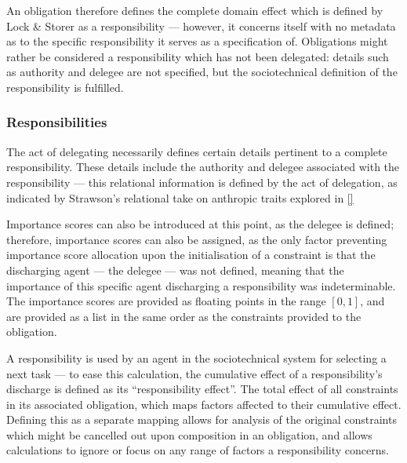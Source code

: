 An obligation therefore defines the complete domain effect which is defined by Lock \& Storer as a responsibility --- however, it concerns itself with no metadata as to the specific responsibility it serves as a specification of. Obligations might rather be considered a responsibility which has not been delegated: details such as authority and delegee are not specified, but the sociotechnical definition of the responsibility is fulfilled.\par

\subsubsection{Responsibilities}\label{subsec:responsibilities}  %
The act of delegating necessarily defines certain details pertinent to a complete responsibility. These details include the authority and delegee associated with the responsibility --- this relational information is defined by the act of delegation, as indicated by Strawson's relational take on anthropic traits explored in \cref{}\par

Importance scores can also be introduced at this point, as the delegee is defined; therefore, importance scores can also be assigned, as the only factor preventing importance score allocation upon the initialisation of a constraint is that the discharging agent --- the delegee --- was not defined, meaning that the importance of this specific agent discharging a responsibility was indeterminable. The importance scores are provided as floating points in the range \([0,1]\), and are provided as a list in the same order as the constraints provided to the obligation.\par

A responsibility is used by an agent in the sociotechnical system for selecting a next task --- to ease this calculation, the cumulative effect of a responsibility's discharge is defined as its ``responsibility effect''. The total effect of all constraints in its associated obligation, which maps factors affected to their cumulative effect. Defining this as a separate mapping allows for analysis of the original constraints which might be cancelled out upon composition in an obligation, and allows calculations to ignore or focus on any range of factors a responsibility concerns.\par

